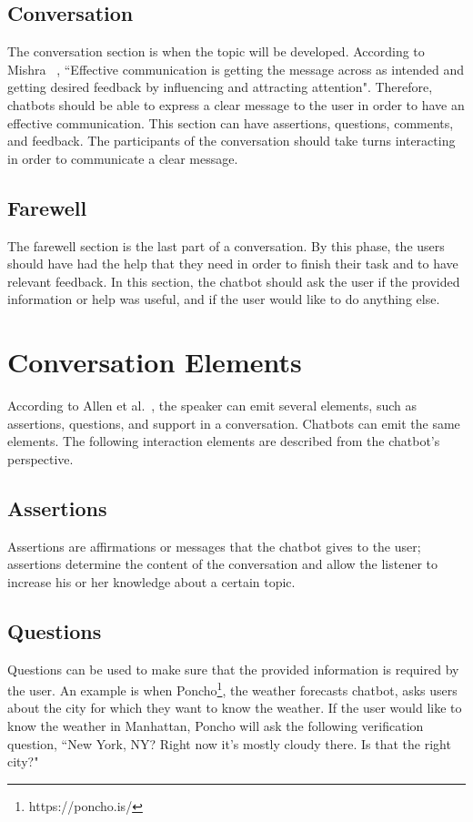 \documentclass[a4paper,10pt]{article}
\begin{document}
\subsection{Conversation}
The conversation section is when the topic will be developed. According to Mishra ~\cite{effectivCommunication}, ``Effective communication is getting the message across as intended and getting desired feedback by influencing and attracting attention". Therefore, chatbots should be able to express a clear message to the user in order to have an effective communication. This section can have assertions, questions, comments, and feedback. The participants of the conversation should take turns interacting in order to communicate a clear message.

\subsection{Farewell}
The farewell section is the last part of a conversation. By this phase, the users should have had the help that they need in order to finish their task and to have relevant feedback. In this section, the chatbot should ask the user if the provided information or help was useful, and if the user would like to do anything else. 

\section{Conversation Elements}
According to Allen et al.~\cite{allen1978conversation}, the speaker can emit several elements, such as assertions, questions, and support in a conversation. Chatbots can emit the same elements. The following interaction elements are described from the chatbot's perspective. 

\subsection{Assertions}
Assertions are affirmations or messages that the chatbot gives to the user; assertions determine the content of the conversation and allow the listener to increase his or her knowledge about a certain topic. 

\subsection{Questions}
Questions can be used to make sure that the provided information is required by the user. An example is when Poncho\footnote{https://poncho.is/}, the weather forecasts chatbot, asks users about the city for which they want to know the weather. If the user would like to know the weather in Manhattan, Poncho will ask the following verification question, ``New York, NY? Right now it's mostly cloudy there. Is that the right city?"
\end{document}
